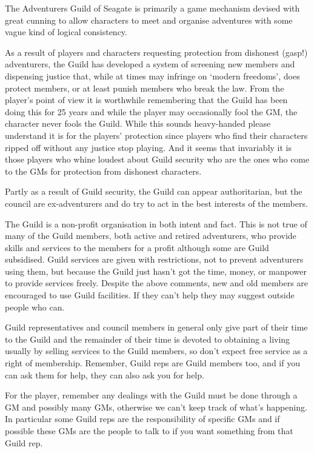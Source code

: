 \documentclass[twoside,a4paper]{article}
\begin{document}
\begin{multicols}{2}
The Adventurers Guild of Seagate is primarily a game mechanism devised
with great cunning to allow characters to meet and organise adventures
with some vague kind of logical consistency.

As a result of players and characters requesting protection from
dishonest (gasp!)  adventurers, the Guild has developed a system of
screening new members and dispensing justice that, while at times may
infringe on `modern freedoms', does protect members, or at least
punish members who break the law.  From the player's point of view it
is worthwhile remembering that the Guild has been doing this for 25
years and while the player may occasionally fool the GM, the character
never fools the Guild.  While this sounds heavy-handed please
understand it is for the players' protection since players who find
their characters ripped off without any justice stop playing. And it
seems that invariably it is those players who whine loudest about
Guild security who are the ones who come to the GMs for protection
from dishonest characters.

Partly as a result of Guild security, the Guild can appear
authoritarian, but the council are ex-adventurers and do try to act in
the best interests of the members.

The Guild is a non-profit organisation in both intent and fact. This
is not true of many of the Guild members, both active and retired
adventurers, who provide skills and services to the members for a
profit although some are Guild subsidised.  Guild services are given
with restrictions, not to prevent adventurers using them, but because
the Guild just hasn't got the time, money, or manpower to provide
services freely.  Despite the above comments, new and old members are
encouraged to use Guild facilities. If they can't help they may
suggest outside people who can.

Guild representatives and council members in general only give part of
their time to the Guild and the remainder of their time is devoted to
obtaining a living usually by selling services to the Guild members,
so don't expect free service as a right of membership.  Remember,
Guild reps are Guild members too, and if you can ask them for help,
they can also ask you for help.

For the player, remember any dealings with the Guild must be done
through a GM and possibly many GMs, otherwise we can't keep track of
what's happening.  In particular some Guild reps are the
responsibility of specific GMs and if possible these GMs are the
people to talk to if you want something from that Guild rep.


\end{multicols}
\end{document}
